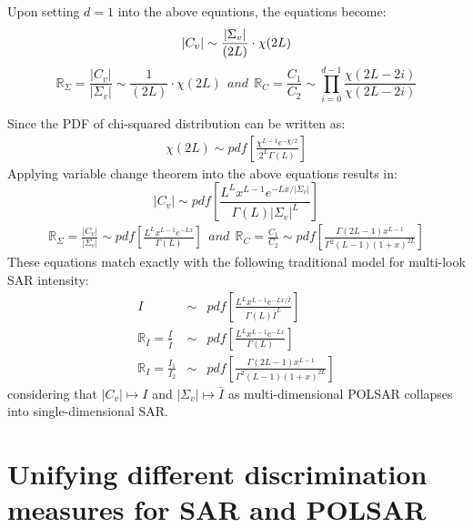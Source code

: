 \documentclass[printer]{tRSL2e}
\begin{document}
Upon setting $d=1$ into the above equations,
  the equations become:
\begin{equation}
  |C_v| \sim { \frac{|\Sigma_v|}{(2L)} \cdot \chi (2L) }\\ %
  \end{equation}
\begin{equation}
  \mathbb{R}_{\Sigma} = \frac{|C_v|}{|\Sigma_v|} \sim \frac{1}{(2L)} \cdot \chi(2L) ~~and~~
\mathbb{R}_{C} = \frac{C_1}{C_2} \sim \prod_{i=0}^{d-1} \frac{\chi(2L-2i)}{\chi(2L-2i)}
\end{equation}

Since the PDF of chi-squared distribution can be written as:
\begin{align*}
\chi(2L) \sim pdf \left[ \frac{\chi^{L-1}e^{-\chi/2}}{2^L\Gamma(L)} \right]
\end{align*}
Applying variable change theorem into the above equations results in:
\begin{equation}
  |C_v| \sim  pdf \left[ \frac{L^L x^{L-1} e^{-Lx/|\Sigma_v|}}{\Gamma(L) |\Sigma_v|^L} \right] \nonumber %
  \end{equation}
  \vspace{-6mm}
\begin{align*}
  \mathbb{R}_{\Sigma} = \frac{|C_v|}{|\Sigma_v|} \sim pdf \left[ \frac{ L^{L} x^{L-1} e^{-Lx}}{ \Gamma(L)} \right]  ~~and~~
  \mathbb{R}_{C} = \frac{C_1}{C_2} \sim pdf \left[ \frac{\Gamma(2L-1) x^{L-1}}{\Gamma^2(L-1) (1+x)^{2L}} \right]
\end{align*}
%
These equations match exactly with the following traditional model for multi-look SAR intensity:
  \begin{eqnarray}
I &\sim& pdf \left[ \frac{L^L x^{L-1} e^{-Lx/\bar{I}}}{\Gamma(L) \bar{I}^L} \right] \\
\mathbb{R}_{\bar{I}} = \frac{I}{\bar{I}} &\sim& pdf \left[ \frac{ L^{L} x^{L-1} e^{-Lx}}{ \Gamma(L)} \label{eqn:multi_look_SAR_ratio_dist} \right] \\
  \mathbb{R}_{I} = \frac{I_1}{I_2} &\sim& pdf \left[ \frac{\Gamma(2L-1) x^{L-1}}{\Gamma^2(L-1) (1+x)^{2L}} \right]
  \end{eqnarray}
considering that $|C_v| \mapsto I$ and $|\Sigma_v| \mapsto \bar{I}$ as multi-dimensional POLSAR collapses into single-dimensional SAR.
  
\section{Unifying different discrimination measures for SAR and POLSAR}
\label{sec:link_sar_polsar}
\end{document}
